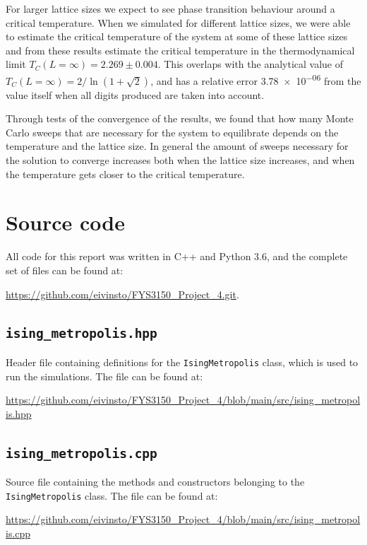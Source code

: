 \documentclass[reprint,english,notitlepage]{revtex4-1}  %
\begin{document}
For larger lattice sizes we expect to see phase transition behaviour around a critical temperature. When we simulated for different lattice sizes, we were able to estimate the critical temperature of the system at some of these lattice sizes and from these results estimate the critical temperature in the thermodynamical limit $T_C(L=\infty) = 2.269 \pm 0.004$. This overlaps with the analytical value of $T_C(L=\infty) = 2/\ln(1 + \sqrt{2})$, and has a relative error \num{3.78e-06} from the value itself when all digits produced are taken into account.

Through tests of the convergence of the results, we found that how many Monte Carlo sweeps that are necessary for the system to equilibrate depends on the temperature and the lattice size. In general the amount of sweeps necessary for the solution to converge increases both when the lattice size increases, and when the temperature gets closer to the critical temperature. 

\onecolumngrid
{}
\newpage
\twocolumngrid

\appendix
\section{Source code} \label{A}
All code for this report was written in C++ and Python 3.6, and the complete set of files can be found at:

\url{https://github.com/eivinsto/FYS3150_Project_4.git}.

\cprotect\subsection{\verb+ising_metropolis.hpp+} \label{A.1}

Header file containing definitions for the \verb+IsingMetropolis+ class, which is used to run the simulations. The file can be found at:

\url{https://github.com/eivinsto/FYS3150_Project_4/blob/main/src/ising_metropolis.hpp}

\cprotect\subsection{\verb+ising_metropolis.cpp+} \label{A.2}

Source file containing the methods and constructors belonging to the \verb+IsingMetropolis+ class. The file can be found at:

\url{https://github.com/eivinsto/FYS3150_Project_4/blob/main/src/ising_metropolis.cpp}
\end{document}
